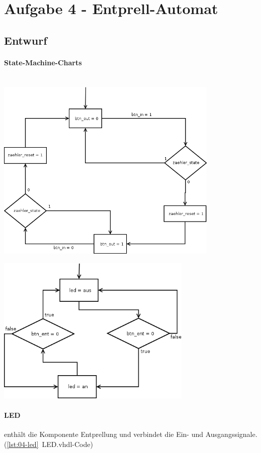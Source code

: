 \section{Aufgabe 4 - Entprell-Automat}
\subsection{Entwurf}
\paragraph{State-Machine-Charts}\hfill \\

	\includegraphics[width=0.8\textwidth]{resources/04-entpreller.png}
		

	\includegraphics[width=0.7\textwidth]{resources/04-led.png}
		

\paragraph{LED} enthält die Komponente Entprellung und verbindet die Ein- und Ausgangssignale. (\ref{lst:04-led}~LED.vhdl-Code) 

